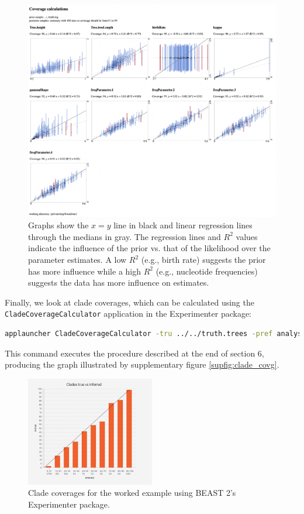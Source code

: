 \documentclass[oneside]{article}
\begin{document}
\begin{figure}
   \includegraphics[width=\textwidth]{../figures/coveragecalculator.png}
   \caption{
     Graphs show the $x=y$ line in black and linear regression lines through the medians in gray.
     The regression lines and $R^2$ values indicate the influence of the prior vs. that of the likelihood over the parameter estimates.
     A low $R^2$ (e.g., birth rate) suggests the prior has more influence while a high $R^2$ (e.g., nucleotide frequencies) suggests the data has more influence on estimates.
   }
   \label{supfig:experimenter}
\end{figure}

Finally, we look at clade coverages, which can be calculated using the \texttt{CladeCoverageCalculator} application in the Experimenter package:

\vspace{.25cm}

{\scriptsize
\begin{lstlisting}[language=bash]
applauncher CladeCoverageCalculator -tru ../../truth.trees -pref analysis-out -png coverage.png -bins 10
\end{lstlisting}
}

This command executes the procedure described at the end of section 6, producing the graph illustrated by supplementary figure \ref{supfig:clade_covg}.

\begin{figure}
  \centering
  \includegraphics[width=0.5\textwidth]{../figures/experimentercoverage.png}
  \caption{Clade coverages for the worked example using BEAST 2's Experimenter package.}
\end{figure}
\end{document}
